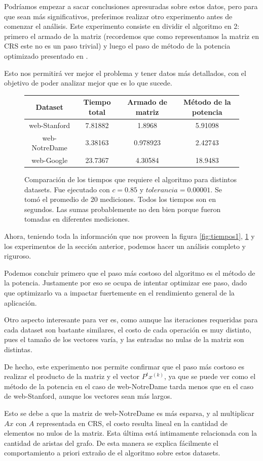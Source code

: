Podríamos empezar a sacar conclusiones apresuradas sobre estos datos, pero para que sean más significativos, preferimos realizar otro experimento antes de comenzar el análisis.
Este experimento consiste en dividir el algoritmo en 2: primero el armado de la matriz (recordemos que como representamos la matriz en CRS este no es un paso trivial) y luego el paso de método de la potencia optimizado presentado en \cite{Kamvar2003}.

Esto nos permitirá ver mejor el problema y tener datos más detallados, con el objetivo de poder analizar mejor que es lo que sucede.

\begin{figure}[H]
\centering
\begin{tabular}{| c | c | c | c |}
  \hline
  Dataset & Tiempo total & Armado de matriz & Método de la potencia \\ \hline \hline
  web-Stanford & 7.81882 & 1.8968 & 5.91098 \\ \hline
  web-NotreDame &  3.38163 & 0.978923 & 2.42743 \\ \hline
  web-Google & 23.7367 & 4.30584 & 18.9483 \\ \hline
\end{tabular}

  \caption{\footnotesize{Comparación de los tiempos que requiere el algoritmo para distintos datasets. Fue ejecutado con $c = 0.85$ y $tolerancia = 0.00001$. Se tomó el promedio de 20 mediciones. Todos los tiempos son en segundos. Las sumas probablemente no den bien porque fueron tomadas en diferentes mediciones. }}
  \label{fig:tiempos2}
\end{figure}


Ahora, teniendo toda la información que nos proveen la figura \ref{fig:tiempos1}, \ref{fig:tiempos2} y los experimentos de la sección anterior, podemos hacer un análisis completo y riguroso.

Podemos concluir primero que el paso más costoso del algoritmo es el método de la potencia. Justamente por eso \cite{Kamvar2003} se ocupa de intentar optimizar ese paso, dado que optimizarlo va a impactar fuertemente en el rendimiento general de la aplicación.


Otro aspecto interesante para ver es, como aunque las iteraciones requeridas para cada dataset son bastante similares, el costo de cada operación es muy distinto, pues el tamaño de los vectores varía, y las entradas no nulas de la matriz son distintas. 

De hecho, este experimento nos permite confirmar que el paso más costoso es realizar el producto de la matriz y el vector $P^t x^{(k)}$, ya que se puede ver como el método de la potencia en el caso de web-NotreDame tarda menos que en el caso de web-Stanford, aunque los vectores sean más largos. 

Esto se debe a que la matriz de web-NotreDame es más esparsa, y al multiplicar $Ax$ con $A$ representada en CRS, el costo resulta lineal en la cantidad de elementos no nulos de la matriz. Esta última está intimamente relacionada con la cantidad de aristas del grafo. De esta manera se explica fácilmente el comportamiento a priori extraño de el algoritmo sobre estos datasets.


